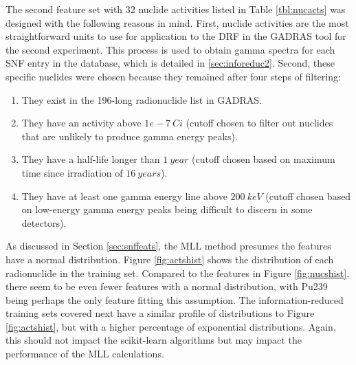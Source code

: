 The second feature set with 32 nuclide activities listed in Table
\ref{tbl:nucacts} was designed with the following reasons in mind. First,
nuclide activities are the most straightforward units to use for application to
the \gls{DRF} in the \gls{GADRAS} tool for the second experiment. This process
is used to obtain gamma spectra for each \gls{SNF} entry in the database, which
is detailed in \ref{sec:inforeduc2}.  Second, these specific nuclides were
chosen because they remained after four steps of filtering:
\begin{enumerate}
  \item They exist in the 196-long radionuclide list in \gls{GADRAS}.
  \item They have an activity above $1e-7\:Ci$ (cutoff chosen to filter out
  nuclides that are unlikely to produce gamma energy peaks).
  \item They have a half-life longer than $1\:year$ (cutoff chosen based on
  maximum time since irradiation of $16\:years$).
  \item They have at least one gamma energy line above $200\:keV$ (cutoff
  chosen based on low-energy gamma energy peaks being difficult to discern in
  some detectors).
\end{enumerate}

As discussed in Section \ref{sec:snffeats}, the \gls{MLL} method presumes the
features have a normal distribution. Figure \ref{fig:actshist} shows the
distribution of each radionuclide in the training set. Compared to the features
in Figure \ref{fig:nucshist}, there seem to be even fewer features with a
normal distribution, with Pu239 being perhaps the only feature fitting this
assumption. The information-reduced training sets covered next have a similar
profile of distributions to Figure \ref{fig:actshist}, but with a higher
percentage of exponential distributions.  Again, this should not impact the
scikit-learn algorithms but may impact the performance of the \gls{MLL}
calculations.  

